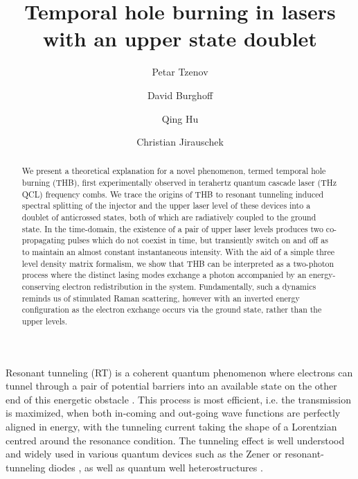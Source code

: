 \documentclass[onecolumn,secnumarabic,amssymb, nobibnotes, aip, prd]{revtex4-1}
\begin{document}
	
	\title{Temporal hole burning in lasers with an upper state doublet}%

	\author{Petar Tzenov}%
	\author{David Burghoff}
	\author{Qing Hu}
	\author{Christian Jirauschek}

	

\begin{abstract}
	We present a theoretical explanation for a novel phenomenon, termed temporal hole burning (THB), first experimentally observed in terahertz quantum cascade laser (THz QCL) frequency combs. We trace the origins of THB to resonant tunneling induced spectral splitting of the injector and the upper laser level of these devices into a doublet of anticrossed states, both of which are radiatively coupled to the ground state. In the time-domain, the existence of a pair of upper laser levels produces two co-propagating pulses which do not coexist in time, but transiently switch on and off as to maintain an almost constant instantaneous intensity. With the aid of a simple three level density matrix formalism, we show that THB can be interpreted as a two-photon process where the distinct lasing modes exchange a photon accompanied by an energy-conserving electron redistribution in the system. Fundamentally, such a dynamics reminds us of stimulated Raman scattering, however with an inverted energy configuration as the electron exchange occurs via the ground state, rather than the upper levels.  
\end{abstract}
\maketitle

Resonant tunneling (RT) is a coherent quantum phenomenon where electrons can tunnel through a pair of potential barriers into an available state on the other end of this energetic obstacle \cite{davies1997physics}. This process is most efficient, i.e. the transmission is maximized, when both in-coming and out-going wave functions are perfectly aligned in energy, with the tunneling current taking the shape of a Lorentzian centred around the resonance condition. The tunneling effect is well understood and widely used in various quantum devices such as the Zener or resonant-tunneling diodes \cite{tsu1973tunneling}, as well as quantum well heterostructures \cite{kazarino1971possibility}. 
\end{document}
